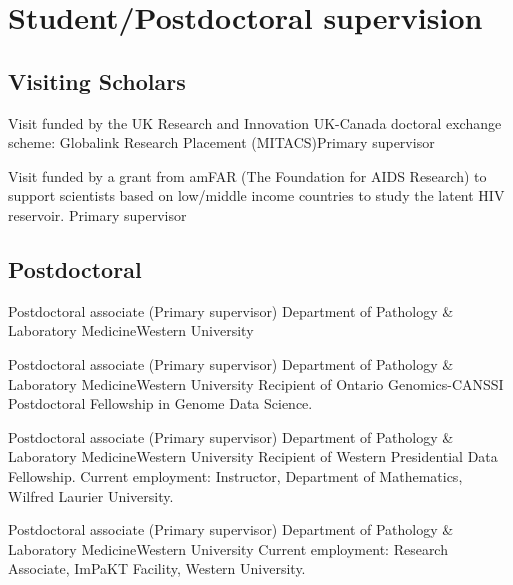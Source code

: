 
\section {Student/Postdoctoral supervision}

\subsection {Visiting Scholars}

{Visit funded by the UK Research and Innovation UK-Canada doctoral exchange scheme: Globalink Research Placement (MITACS)}{}{Primary supervisor}

{Visit funded by a grant from amFAR (The Foundation for AIDS Research) to support scientists based on low/middle income countries to study the latent HIV reservoir.}
{}{Primary supervisor}



\subsection {Postdoctoral}

{Postdoctoral associate (Primary supervisor)}
{Department of Pathology \& Laboratory Medicine}{Western University}
{}


{Postdoctoral associate (Primary supervisor)}
{Department of Pathology \& Laboratory Medicine}{Western University}
{Recipient of Ontario Genomics-CANSSI Postdoctoral Fellowship in Genome Data Science.}


{Postdoctoral associate (Primary supervisor)}
{Department of Pathology \& Laboratory Medicine}{Western University}
{Recipient of Western Presidential Data Fellowship.  Current employment: Instructor, Department of Mathematics, Wilfred Laurier University.}


{Postdoctoral associate (Primary supervisor)}
{Department of Pathology \& Laboratory Medicine}{Western University}
{Current employment: Research Associate, ImPaKT Facility, Western University.}


